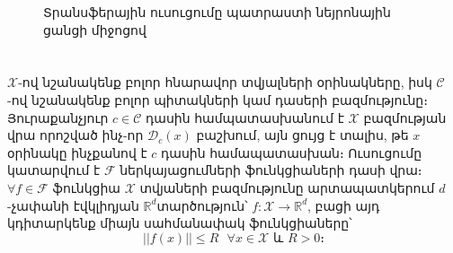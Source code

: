 \documentclass[12pt]{article}
\begin{document}
\begin{figure}[h]
\caption{Տրանսֆերային ուսուցումը պատրաստի նեյրոնային ցանցի միջոցով } \label{fig:ml_vs_tl}
\end{figure}









\pagebreak


\section*{
 } \noindent
{}
{}
 
 $\mathcal{X}$-ով նշանակենք բոլոր հնարավոր տվյալների օրինակները, իսկ $\mathcal{C}$-ով նշանակենք բոլոր պիտակների կամ դասերի բազմությունը։ Յուրաքանչյուր $c \in \mathcal{C}$ դասին համպատասխանում է $\mathcal{X}$ բազմության վրա որոշված ինչ-որ $\mathcal{D}_c(x)$ բաշխում, այն ցույց է տալիս, թե $x$ օրինակը ինչքանով է $c$ դասին համապատասխան։ Ուսուցումը կատարվում է $\mathcal{F}$ ներկայացումների ֆունկցիաների դասի վրա։ $\forall f \in \mathcal{F}$  ֆունկցիա $\mathcal{X}$ տվյաների բազմությունը արտապատկերում $d$-չափանի էվկլիդյան $\mathbb{R}^d$տարծություն՝ $f:\mathcal{X}\rightarrow\mathbb{R}^d$, բացի այդ կդիտարկենք միայն սահմանափակ ֆունկցիաները՝
 $$||f(x)|| \leq R \text{    } \forall x \in \mathcal{X} \text{ և } R > 0։$$ 


\end{document}
